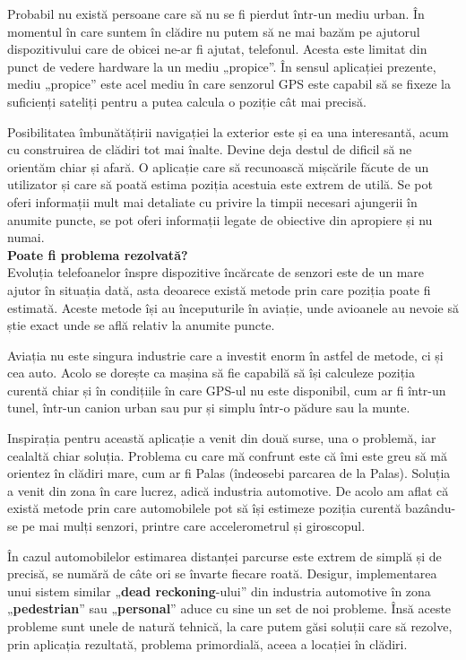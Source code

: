 \documentclass[12pt,a4paper]{article}
\begin{document}
Probabil nu există persoane care să nu se fi pierdut într-un mediu urban. În momentul în care suntem în clădire nu putem să ne mai bazăm pe ajutorul dispozitivului care de obicei ne-ar fi ajutat, telefonul. Acesta este limitat din punct de vedere hardware la un mediu „propice”. În sensul aplicației prezente, mediu „propice” este acel mediu în care senzorul GPS este capabil să se fixeze la suficienți sateliți pentru a putea calcula o poziție cât mai precisă.

Posibilitatea îmbunătățirii navigației la exterior este și ea una interesantă, acum cu construirea de clădiri tot mai înalte. Devine deja destul de dificil să ne orientăm chiar și afară. O aplicație care să recunoască mișcările făcute de un utilizator și care să poată estima poziția acestuia este extrem de utilă. Se pot oferi informații mult mai detaliate cu privire la timpii necesari ajungerii în anumite puncte, se pot oferi informații legate de obiective din apropiere și nu numai.\\

\textbf{Poate fi problema rezolvată?}\\
Evoluția telefoanelor înspre dispozitive încărcate de senzori este de un mare ajutor în situația dată, asta deoarece există metode prin care poziția poate fi estimată. Aceste metode își au începuturile în aviație, unde avioanele au nevoie să știe exact unde se află relativ la anumite puncte. 

Aviația nu este singura industrie care a investit enorm în astfel de metode, ci și cea auto. Acolo se dorește ca mașina să fie capabilă să își calculeze poziția curentă chiar și în condițiile în care GPS-ul nu este disponibil, cum ar fi într-un tunel, într-un canion urban sau pur și simplu într-o pădure sau la munte.

Inspirația pentru această aplicație a venit din două surse, una o problemă, iar cealaltă chiar soluția. Problema cu care mă confrunt este că îmi este greu să mă orientez în clădiri mare, cum ar fi Palas (îndeosebi parcarea de la Palas). Soluția a venit din zona în care lucrez, adică industria automotive. De acolo am aflat că există metode prin care automobilele pot să își estimeze poziția curentă bazându-se pe mai mulți senzori, printre care accelerometrul și giroscopul. 

În cazul automobilelor estimarea distanței parcurse este extrem de simplă și de precisă, se numără de câte ori se învarte fiecare roată. Desigur, implementarea unui sistem similar „\textbf{dead reckoning}-ului” din industria automotive în zona „\textbf{pedestrian}” sau „\textbf{personal}” aduce cu sine un set de noi probleme. Însă aceste probleme sunt unele de natură tehnică, la care putem găsi soluții care să rezolve, prin aplicația rezultată, problema primordială, aceea a locației în clădiri.\\
\end{document}
